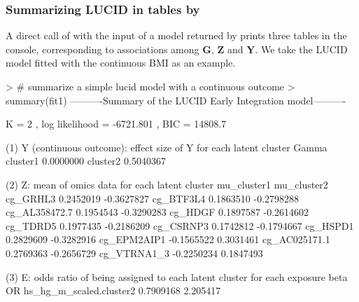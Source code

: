 \subsubsection{Summarizing LUCID in tables by }
 A direct call of  with the input of a model returned by  prints three tables in the console, corresponding to associations among $\bm G$, $\bm Z$ and $\bm Y$. We take the LUCID model fitted with the continuous BMI as an example.
\begin{example}
> # summarize a simple lucid model with a continuous outcome
> summary(fit1)
----------Summary of the LUCID Early Integration model---------- 
 
K =  2 , log likelihood = -6721.801 , BIC =  14808.7 
 
(1) Y (continuous outcome): effect size of Y for each latent cluster
             Gamma
cluster1 0.0000000
cluster2 0.5040367

(2) Z: mean of omics data for each latent cluster 
              mu_cluster1 mu_cluster2
cg_GRHL3        0.2452019  -0.3627827
cg_BTF3L4       0.1863510  -0.2798288
cg_AL358472.7   0.1954543  -0.3290283
cg_HDGF         0.1897587  -0.2614602
cg_TDRD5        0.1977435  -0.2186209
cg_CSRNP3       0.1742812  -0.1794667
cg_HSPD1        0.2829609  -0.3282916
cg_EPM2AIP1    -0.1565522   0.3031461
cg_AC025171.1   0.2769363  -0.2656729
cg_VTRNA1_3    -0.2250234   0.1847493

(3) E: odds ratio of being assigned to each latent cluster for each exposure 
                             beta       OR
hs_hg_m_scaled.cluster2 0.7909168 2.205417
\end{example}
